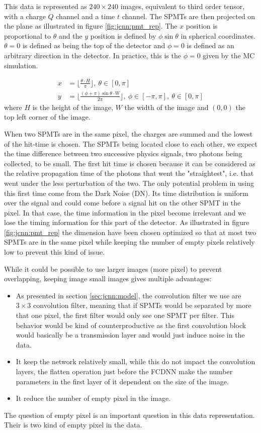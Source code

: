 This data is represented as $240 \times 240$ images, equivalent to third order tensor, with a charge $Q$ channel and a time $t$ channel. The SPMTs are then projected on the plane as illustrated in figure \ref{fig:jcnn:pmt_rep}. The $x$ position is proportional to $\theta$ and the $y$ position is defined by $\phi \sin{\theta}$ in spherical coordinates. $\theta = 0$ is defined as being the top of the detector and $\phi = 0$ is defined as an arbitrary direction in the detector. In practice, this is the $\phi = 0$ given by the MC simulation.

\begin{align}
  x &= \bigg\lfloor \frac{\theta \cdot H}{\pi} \bigg\rfloor, ~ \theta \in [0, \pi] \\
  y &= \bigg\lfloor \frac{(\phi + \pi) \sin{\theta} \cdot W}{2\pi}\bigg\rfloor, ~ \phi \in [-\pi, \pi], ~ \theta \in [0, \pi]
\end{align}
where $H$ is the height of the image, $W$ the width of the image and $(0,0)$ the top left corner of the image.

When two SPMTs are in the same pixel, the charges are summed and the lowest of the hit-time is chosen. The SPMTs being located close to each other, we expect the time difference between two successive physics signals, two photons being collected, to be small. The first hit time is chosen because it can be considered as the relative propagation time of the photons that went the "straightest", i.e. that went under the less perturbation of the two. The only potential problem in using this first time come from the Dark Noise (DN). Its time distribution is uniform over the signal and could come before a signal hit on the other SPMT in the pixel. In that case, the time information in the pixel become irrelevant and we lose the timing information for this part of the detector.
As illustrated in figure \ref{fig:jcnn:pmt_rep} the dimension have been chosen optimized so that at most two SPMTs are in the same pixel while keeping the number of empty pixels relatively low to prevent this kind of issue.

While it could be possible to use larger images (more pixel) to prevent overlapping, keeping image small images gives multiple advantages:
\begin{itemize}
  \item As presented in section \ref{sec:jcnn:model}, the convolution filter we use are $3 \times 3$ convolution filter, meaning that if SPMTs would be separated by more that one pixel, the first filter would only see one SPMT per filter. This behavior would be kind of counterproductive as the first convolution block would basically be a transmission layer and would just induce noise in the data.
  \item It keep the network relatively small, while this do not impact the convolution layers, the flatten operation just before the FCDNN make the number parameters in the first layer of it dependent on the size of the image.
  \item It reduce the number of empty pixel in the image.
\end{itemize}
The question of empty pixel is an important question in this data representation. Their is two kind of empty pixel in the data.

